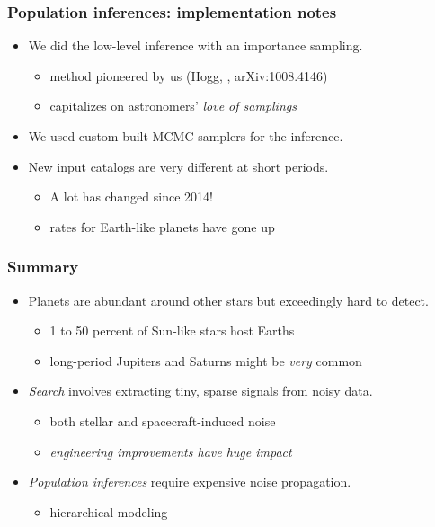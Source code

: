 \documentclass[pdftex]{beamer}
\newcommand{\conclusions}{%
\begin{frame}
  \frametitle{Summary}
  \begin{itemize}
  \item Planets are abundant around other stars but exceedingly hard to detect.
    \begin{itemize}
    \item 1 to 50 percent of Sun-like stars host Earths
    \item long-period Jupiters and Saturns might be \emph{very} common
    \end{itemize}
  \item \emph{Search} involves extracting tiny, sparse signals from noisy data.
    \begin{itemize}
    \item both stellar and spacecraft-induced noise
    \item \emph{engineering improvements have huge impact}
    \end{itemize}
  \item \emph{Population inferences} require expensive noise propagation.
    \begin{itemize}
    \item hierarchical modeling
    \end{itemize}
  \end{itemize}
\end{frame}}
\begin{document}
\begin{frame}
  \frametitle{Population inferences: implementation notes}
  \begin{itemize}
  \item We did the low-level inference with an importance sampling.
    \begin{itemize}
    \item method pioneered by us {\footnotesize (Hogg, \etal, arXiv:1008.4146)}
    \item capitalizes on astronomers' \emph{love of samplings}
    \end{itemize}
  \item We used custom-built MCMC samplers for the inference.
  \item New input catalogs are very different at short periods.
    \begin{itemize}
    \item A lot has changed since 2014!
    \item rates for Earth-like planets have gone up
    \end{itemize}
  \end{itemize}
\end{frame}

\conclusions
\end{document}
